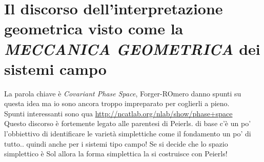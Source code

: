 \documentclass[Main]{subfiles}
\begin{document}
	\section{Il discorso dell'interpretazione geometrica visto come la \emph{MECCANICA GEOMETRICA} dei sistemi campo}
		La parola chiave è \emph{Covariant Phase Space}, Forger-ROmero danno spunti su questa idea ma io sono ancora troppo impreparato per coglierli a pieno.\\
		Spunti interessanti sono qua \url{http://ncatlab.org/nlab/show/phase+space}
		\\
		Questo discorso è fortemente legato alle parentesi di Peierls. di base c'è un po' l'obbiettivo di identificare le varietà simplettiche come il fondamento un po' di tutto.. quindi anche per i sistemi tipo campo!
		Se si decide che lo spazio simplettico è Sol allora la forma simplettica la si costruisce con  Peierls!
\end{document}
